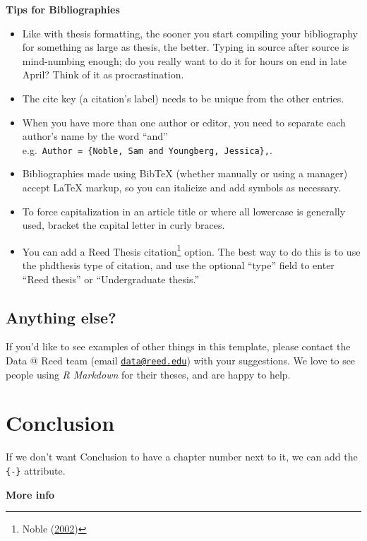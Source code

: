 \documentclass[12pt,twoside]{reedthesis}
\providecommand{\tightlist}{%
  \setlength{\itemsep}{0pt}\setlength{\parskip}{0pt}}
\begin{document}
\textbf{Tips for Bibliographies}
\begin{itemize}
\tightlist
\item
  Like with thesis formatting, the sooner you start compiling your bibliography for something as large as thesis, the better. Typing in source after source is mind-numbing enough; do you really want to do it for hours on end in late April? Think of it as procrastination.
\item
  The cite key (a citation's label) needs to be unique from the other entries.
\item
  When you have more than one author or editor, you need to separate each author's name by the word ``and'' e.g.~\texttt{Author\ =\ \{Noble,\ Sam\ and\ Youngberg,\ Jessica\},}.
\item
  Bibliographies made using BibTeX (whether manually or using a manager) accept LaTeX markup, so you can italicize and add symbols as necessary.
\item
  To force capitalization in an article title or where all lowercase is generally used, bracket the capital letter in curly braces.
\item
  You can add a Reed Thesis citation\footnote{Noble (\protect\hyperlink{ref-noble2002}{2002})} option. The best way to do this is to use the phdthesis type of citation, and use the optional ``type'' field to enter ``Reed thesis'' or ``Undergraduate thesis.''
\end{itemize}
\hypertarget{anything-else}{%
\section{Anything else?}\label{anything-else}}

If you'd like to see examples of other things in this template, please contact the Data @ Reed team (email \href{mailto:data@reed.edu}{\nolinkurl{data@reed.edu}}) with your suggestions. We love to see people using \emph{R Markdown} for their theses, and are happy to help.

\hypertarget{conclusion}{%
\chapter*{Conclusion}\label{conclusion}}

If we don't want Conclusion to have a chapter number next to it, we can add the \texttt{\{-\}} attribute.

\textbf{More info}
\end{document}
